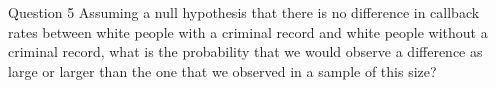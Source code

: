 \documentclass[presentation]{beamer}
\begin{document}
\begin{frame}[label={sec:org3bf08ae}]{Question 5}
Assuming a null hypothesis that there is no difference in callback rates between white people with a criminal record and white people without a criminal record, what is the probability that we would observe a difference as large or larger than the one that we observed in a sample of this size?
\end{frame}
\end{document}

